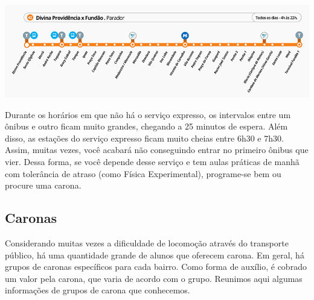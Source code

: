         \begin{center}
        	\includegraphics[width=\textwidth]{assets/mapa_transcarioca_parador1.png}
        \end{center}
        
            Durante os horários em que não há o serviço expresso, os intervalos entre um ônibus e outro ficam muito grandes, chegando a 25 minutos de espera. Além disso, as estações do serviço expresso ficam muito cheias entre 6h30 e 7h30. Assim, muitas vezes, você acabará não conseguindo entrar no primeiro ônibus que vier. Dessa forma, se você depende desse serviço e tem aulas práticas de manhã com tolerância de atraso (como Física Experimental), programe-se bem ou procure uma carona.
    
    \subsection{Caronas}
    Considerando muitas vezes a dificuldade de locomoção através do transporte público, há uma quantidade grande de alunos que oferecem carona. Em geral, há grupos de caronas específicos para cada bairro. Como forma de auxílio, é cobrado um valor pela carona, que varia de acordo com o grupo. Reunimos aqui algumas informações de grupos de carona que conhecemos.
    
